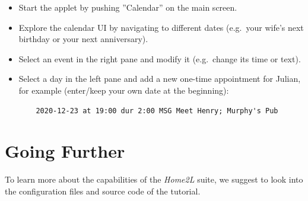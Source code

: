 \documentclass[12pt,english,parskip=half,headheight=19pt]{scrreprt}
\begin{document}
\begin{itemize}[$\blacktriangleright$]
\item
  Start the applet by pushing ''Calendar'' on the main screen.
\item
  Explore the calendar UI by navigating to different dates (e.g.~your wife's
  next birthday or your next anniversary).
\item
  Select an event in the right pane and modify it (e.g.~change its time
  or text).
\item
  Select a day in the left pane and add a new one-time appointment for
  Julian, for example (enter/keep your own date at the beginning):
  \begin{lstlisting}
    2020-12-23 at 19:00 dur 2:00 MSG Meet Henry; Murphy's Pub
  \end{lstlisting}
\end{itemize}





\clearpage
\section{Going Further}
\label{sec:tutorial-goingfurther}


To learn more about the capabilities of the \textit{Home2L} suite, we
suggest to look into the configuration files and source code of the
tutorial.
\end{document}
